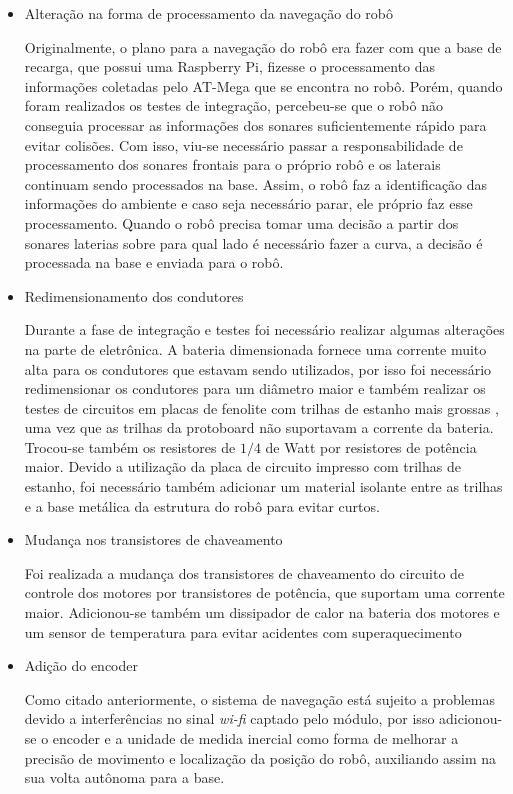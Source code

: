 \begin{itemize}
      \item Alteração na forma de processamento da navegação do robô

      Originalmente, o plano para a navegação do robô era fazer com que a base de recarga, que possui uma Raspberry Pi, fizesse o processamento das informações coletadas pelo AT-Mega que se encontra no robô. Porém, quando foram realizados os testes de integração, percebeu-se que o robô não conseguia processar as informações dos sonares suficientemente rápido para evitar colisões. Com isso, viu-se necessário passar a responsabilidade de processamento dos sonares frontais para o próprio robô e os laterais continuam sendo processados na base. Assim, o robô faz a identificação das informações do ambiente e caso seja necessário parar, ele próprio faz esse processamento. Quando o robô precisa tomar uma decisão a partir dos sonares laterias sobre para qual lado é necessário fazer a curva, a decisão é processada na base e enviada para o robô.

      \item Redimensionamento dos condutores

      Durante a fase de integração e testes foi necessário realizar algumas alterações na parte de eletrônica. A bateria dimensionada fornece uma corrente muito alta para os condutores que estavam sendo utilizados, por isso foi necessário redimensionar os condutores para um diâmetro maior e também realizar os testes de circuitos em placas de fenolite com trilhas de estanho mais grossas , uma vez que as trilhas da protoboard não suportavam a corrente da bateria. Trocou-se também os resistores de $1/4$ de Watt por resistores de potência maior. Devido a utilização da placa de circuito impresso com trilhas de estanho, foi necessário também adicionar um material isolante entre as trilhas e a base metálica da estrutura do robô para evitar curtos.

      \item Mudança nos transistores de chaveamento

      Foi realizada a mudança dos transistores de chaveamento do circuito de controle dos motores por transistores de potência, que suportam uma corrente maior. Adicionou-se também um dissipador de calor na bateria dos motores e um sensor de temperatura para evitar acidentes com superaquecimento

      \item Adição do encoder

      Como citado anteriormente, o sistema de navegação está sujeito a problemas devido a interferências no sinal \textit{wi-fi} captado pelo módulo, por isso adicionou-se o encoder e a unidade de medida inercial como forma de melhorar a precisão de movimento e localização da posição do robô, auxiliando assim na  sua volta autônoma para a base.


   \end{itemize}


